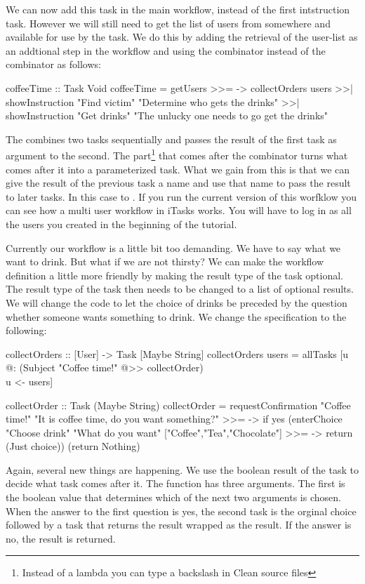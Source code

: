 \documentclass[a4paper,11pt]{article}
\begin{document}
We can now add this task in the main workflow, instead of the first intstruction task. However we will still need to get the list of users from somewhere and available for use by the  task. We do this by adding the retrieval of the user-list as an addtional step in the workflow and using the \CleanInline{>>=} combinator instead of the \CleanInline{>>|} combinator as follows:
\begin{CleanCode}
coffeeTime :: Task Void
coffeeTime
  =   getUsers
  >>= \users -> collectOrders users
  >>| showInstruction "Find victim" "Determine who gets the drinks"
  >>| showInstruction "Get drinks" "The unlucky one needs to go get the drinks"
\end{CleanCode}
The \CleanInline{>>=} combines two tasks sequentially and passes the result of the first task as argument to the second. The \CleanInline{\\users ->} part\footnote{Instead of a lambda you can type a backslash in Clean source files} that comes after the \CleanInline{>>=} combinator turns what comes after it into a parameterized task. What we gain from this is that we can give the result of the previous task a name and use that name to pass the result to later tasks. In this case to . If you run the current version of this worfklow you can see how a multi user workflow in iTasks works. You will have to log in as all the users you created in the beginning of the tutorial.

Currently our workflow is a little bit too demanding. We have to say what we want to drink. But what if we are not thirsty? We can make the workflow definition a little more friendly by making the result type of the  task optional. The result type of the  task then needs to be changed to a list of optional results. We will change the code to let the choice of drinks be preceded by the question whether someone wants something to drink. We change the specification to the following:
\begin{CleanCode}
collectOrders :: [User] -> Task [Maybe String]
collectOrders users 
	= allTasks [u @: (Subject "Coffee time!" @>> collectOrder) \\ u <- users]

collectOrder :: Task (Maybe String)
collectOrder
	= requestConfirmation "Coffee time!" "It is coffee time, do you want something?"
	>>= \yes -> if yes
		(enterChoice "Choose drink" "What do you want" ["Coffee","Tea","Chocolate"]
		>>= \choice -> return (Just choice))
		(return Nothing)
\end{CleanCode}
Again, several new things are happening. We use the boolean result of the  task to decide what task comes after it.
The  function has three arguments. The first is the boolean value that determines which of the next two arguments is chosen. When the answer to the first question is yes, the second task is the orginal choice followed by a task that returns the result wrapped as  the result. If the answer is no, the result  is returned.
\end{document}
